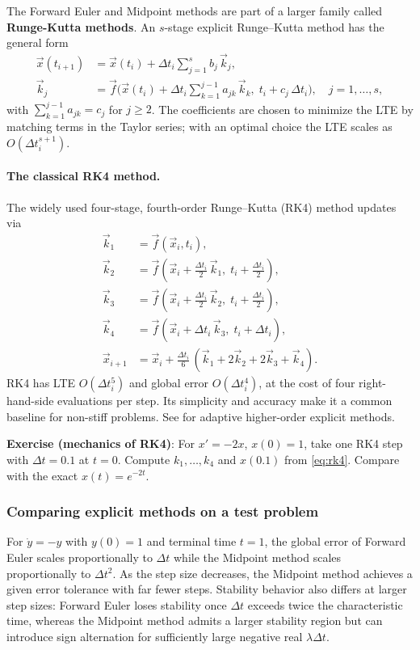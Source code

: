 The Forward Euler and Midpoint methods are part of a larger family called \textbf{Runge-Kutta methods}. An $s$-stage explicit Runge--Kutta method has the general form
\begin{align}
    \vec{x}(t_{i+1}) &= \vec{x}(t_i) + \Delta t_i\sum_{j=1}^{s} b_j\,\vec{k}_j, \\
    \vec{k}_j &= \vec{f}\Big(\vec{x}(t_i) + \Delta t_i\sum_{k=1}^{j-1} a_{jk}\,\vec{k}_k,\; t_i + c_j\,\Delta t_i\Big),\quad j=1,\dots,s,
\end{align}
with $\sum_{k=1}^{j-1} a_{jk} = c_j$ for $j\ge 2$. The coefficients are chosen to minimize the LTE by matching terms in the Taylor series; with an optimal choice the LTE scales as $O(\Delta t_i^{s+1})$.

\paragraph{The classical RK4 method.} The widely used four-stage, fourth-order Runge--Kutta (RK4) method updates via
\begin{align}
    \vec{k}_1 &= \vec{f}(\vec{x}_i, t_i), \\
    \vec{k}_2 &= \vec{f}\!\left(\vec{x}_i + \tfrac{\Delta t_i}{2}\,\vec{k}_1,\; t_i + \tfrac{\Delta t_i}{2}\right), \\
    \vec{k}_3 &= \vec{f}\!\left(\vec{x}_i + \tfrac{\Delta t_i}{2}\,\vec{k}_2,\; t_i + \tfrac{\Delta t_i}{2}\right), \\
    \vec{k}_4 &= \vec{f}\!\left(\vec{x}_i + \Delta t_i\,\vec{k}_3,\; t_i + \Delta t_i\right), \\
    \vec{x}_{i+1} &= \vec{x}_i + \tfrac{\Delta t_i}{6}\,(\vec{k}_1 + 2\vec{k}_2 + 2\vec{k}_3 + \vec{k}_4).\label{eq:rk4}
\end{align}
RK4 has LTE $O(\Delta t_i^5)$ and global error $O(\Delta t_i^4)$, at the cost of four right-hand-side evaluations per step. Its simplicity and accuracy make it a common baseline for non-stiff problems. See \cite{DormandPrince1980,ShampineReichelt1997} for adaptive higher-order explicit methods.

\begin{exampleBox}
    \textbf{Exercise (mechanics of RK4)}: For $x'=-2x$, $x(0)=1$, take one RK4 step with $\Delta t=0.1$ at $t=0$. Compute $k_1,\dots,k_4$ and $x(0.1)$ from \autoref{eq:rk4}. Compare with the exact $x(t)=e^{-2t}$.
\end{exampleBox}

\subsubsection{Comparing explicit methods on a test problem}
For $\dot{y}=-y$ with $y(0)=1$ and terminal time $t=1$, the global error of Forward Euler scales proportionally to $\Delta t$ while the Midpoint method scales proportionally to $\Delta t^2$. As the step size decreases, the Midpoint method achieves a given error tolerance with far fewer steps. Stability behavior also differs at larger step sizes: Forward Euler loses stability once $\Delta t$ exceeds twice the characteristic time, whereas the Midpoint method admits a larger stability region but can introduce sign alternation for sufficiently large negative real $\lambda\Delta t$.

